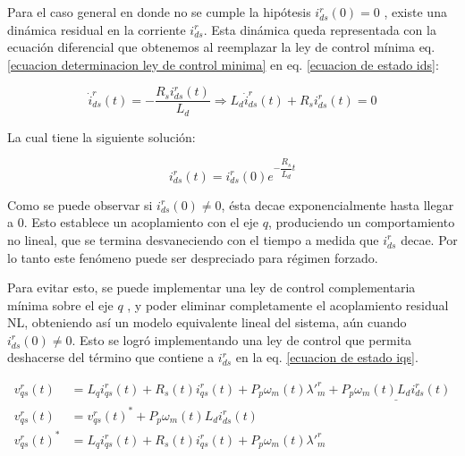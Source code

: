 \documentclass[a4paper, 10pt, onecolumn,journal]{ieeeconf}
\begin{document}
Para el caso general en donde no se cumple la hipótesis $i^{r}_{ds}(0)=0$ , existe una dinámica residual en la corriente $i^{r}_{ds}$. Esta dinámica queda representada con la ecuación diferencial que obtenemos al reemplazar la ley de control mínima eq. \cref{ecuacion determinacion ley de control minima} en eq. \cref{ecuacion de estado ids}:

\begin{equation}
	\dot{i}^r_{ds}(t) = -\frac{R_s i^r_{ds}(t)}{L_d} \Rightarrow L_d\dot{i}^r_{ds}(t) + R_s i^r_{ds}(t) = 0
	\label{ecuacion dinamica residual ids}
\end{equation}

La cual tiene la siguiente solución:

\begin{equation}
	{i}^r_{ds}(t) = {i}^r_{ds}(0) e^{-\dfrac{R_s}{L_d}t} 
\end{equation}

Como se puede observar  si $i^{r}_{ds}(0)\neq0$, ésta decae exponencialmente hasta llegar a 0. Esto establece un acoplamiento con el eje $q$, produciendo un comportamiento no lineal, que se termina desvaneciendo con el tiempo a medida que $i^{r}_{ds}$ decae. Por lo tanto este fenómeno puede ser despreciado para régimen forzado.

Para evitar esto, se puede implementar una ley de control complementaria mínima sobre el eje $q$ , y poder eliminar completamente el acoplamiento residual NL, obteniendo así un modelo equivalente lineal del sistema, aún cuando $i^{r}_{ds}(0)\neq0$. Esto se logró implementando una ley de control que permita deshacerse del término que contiene a $i^{r}_{ds}$ en la eq. \eqref{ecuacion de estado iqs}.

\begin{align}
	v^r_{qs}(t) &= L_q{i}^r_{qs}(t) + R_s(t) i^r_{qs}(t) +P_p \omega_m(t) \lambda'^r_m +\underline{P_p \omega_m(t) L_d i^r_{ds}(t)} \label{ley de control complementaria 1 }\\
	v^r_{qs}(t) &= v^r_{qs}(t)^{*} + P_p \omega_m(t) L_d i^r_{ds}(t)  \label{ley de control complementaria 2}\\
 	v^r_{qs}(t)^{*} &= L_q{i}^r_{qs}(t) + R_s(t) i^r_{qs}(t) +P_p \omega_m(t) \lambda'^r_m  \label{ley de control complementaria 3}
\end{align}
\end{document}
